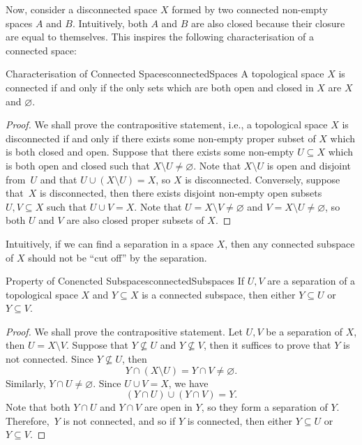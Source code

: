\documentclass[math]{amznotes}
\theoremstyle{remark}
\begin{document}
Now, consider a disconnected space $X$ formed by two connected non-empty spaces $A$ and $B$. Intuitively, both $A$ and $B$ are also closed because their closure are equal to themselves. This inspires the following characterisation of a connected space:
\begin{probox}{Characterisation of Connected Spaces}{connectedSpaces}
    A topological space $X$ is connected if and only if the only sets which are both open and closed in $X$ are $X$ and $\varnothing$.
    \tcblower
    \begin{proof}
        We shall prove the contrapositive statement, i.e., a topological space $X$ is disconnected if and only if there exists some non-empty proper subset of $X$ which is both closed and open. Suppose that there exists some non-empty $U \subseteq X$ which is both open and closed such that $X \setminus U \neq \varnothing$. Note that $X \setminus U$ is open and disjoint from~$U$ and that $U \cup \left(X \setminus U\right) = X$, so $X$ is disconnected. Conversely, suppose that~$X$ is disconnected, then there exists disjoint non-empty open subsets $U, V \subseteq X$ such that $U \cup V = X$. Note that $U = X \setminus V \neq \varnothing$ and $V = X \setminus U \neq \varnothing$, so both $U$ and $V$ are also closed proper subsets of $X$.
    \end{proof}
\end{probox}
Intuitively, if we can find a separation in a space $X$, then any connected subspace of $X$ should not be ``cut off'' by the separation.
\begin{probox}{Property of Conencted Subspaces}{connectedSubspaces}
    If $U, V$ are a separation of a topological space $X$ and $Y \subseteq X$ is a connected subspace, then either $Y \subseteq U$ or $Y \subseteq V$.
    \tcblower
    \begin{proof}
        We shall prove the contrapositive statement. Let $U, V$ be a separation of $X$, then $U = X \setminus V$. Suppose that $Y \not\subseteq U$ and $Y \not\subseteq V$, then it suffices to prove that $Y$ is not connected. Since $Y \not\subseteq U$, then 
        \begin{equation*}
            Y \cap \left(X \setminus U\right) = Y \cap V \neq \varnothing.
        \end{equation*}
        Similarly, $Y \cap U \neq \varnothing$. Since $U \cup V = X$, we have 
        \begin{equation*}
            \left(Y \cap U\right) \cup \left(Y \cap V\right) = Y.
        \end{equation*}
        Note that both $Y \cap U$ and $Y \cap V$ are open in $Y$, so they form a separation of $Y$. Therefore,~$Y$ is not connected, and so if $Y$ is connected, then either $Y \subseteq U$ or $Y \subseteq V$.
    \end{proof}
\end{probox}
\end{document}
